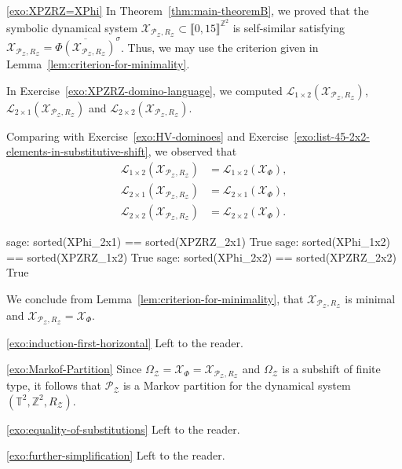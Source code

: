 \documentclass[12pt]{amsart}
\newcommand{\Z}{\mathbb{Z}}
\newcommand{\Lcal}{\mathcal{L}}
\newcommand{\Pcal}{\mathcal{P}}
\newcommand{\Xcal}{\mathcal{X}} %
\newcommand{\Zcal}{\mathcal{Z}}
\newcommand{\shiftclosure}[1]{{\overline{#1}^{\sigma}}}
\newcommand{\Zrange}[1]{\llbracket0,#1\rrbracket}
\newcommand{\torus}{\mathbb{T}}
\begin{document}
    \begin{exosolution}{\ref{exo:XPZRZ=XPhi}}
        In Theorem~\ref{thm:main-theoremB}, we proved that the symbolic dynamical system
        $\Xcal_{\Pcal_\Zcal,R_\Zcal}\subset\Zrange{15}^{\Z^2}$ is self-similar satisfying
        $\Xcal_{\Pcal_\Zcal,R_\Zcal}=\shiftclosure{\Phi(\Xcal_{\Pcal_\Zcal,R_\Zcal})}$.
        Thus, we may use the criterion given in Lemma~\ref{lem:criterion-for-minimality}.

        In Exercise~\ref{exo:XPZRZ-domino-language}, 
        we computed
        $\Lcal_{1\times 2}(\Xcal_{\Pcal_\Zcal,R_\Zcal})$,
        $\Lcal_{2\times 1}(\Xcal_{\Pcal_\Zcal,R_\Zcal})$ and
        $\Lcal_{2\times 2}(\Xcal_{\Pcal_\Zcal,R_\Zcal})$.

        Comparing with 
        Exercise~\ref{exo:HV-dominoes} and
        Exercise~\ref{exo:list-45-2x2-elements-in-substitutive-shift},
        we observed that
        \begin{align*}
            \Lcal_{1\times 2}(\Xcal_{\Pcal_\Zcal,R_\Zcal})&=\Lcal_{1\times 2}(\Xcal_\Phi),\\
            \Lcal_{2\times 1}(\Xcal_{\Pcal_\Zcal,R_\Zcal})&=\Lcal_{2\times 1}(\Xcal_\Phi),\\
            \Lcal_{2\times 2}(\Xcal_{\Pcal_\Zcal,R_\Zcal})&=\Lcal_{2\times 2}(\Xcal_\Phi).
        \end{align*}
\begin{sagecommandlinetcb}
\begin{sagecommandline}
sage: sorted(XPhi_2x1) == sorted(XPZRZ_2x1)
True
sage: sorted(XPhi_1x2) == sorted(XPZRZ_1x2) 
True
sage: sorted(XPhi_2x2) == sorted(XPZRZ_2x2)
True
\end{sagecommandline}
\end{sagecommandlinetcb}
We conclude from Lemma~\ref{lem:criterion-for-minimality},
that $\Xcal_{\Pcal_\Zcal,R_\Zcal}$ is minimal and $\Xcal_{\Pcal_\Zcal,R_\Zcal}=\Xcal_\Phi$.
\end{exosolution}

\begin{exosolution}{\ref{exo:induction-first-horizontal}}
    Left to the reader.
\end{exosolution}

\begin{exosolution}{\ref{exo:Markof-Partition}}
    Since $\Omega_\Zcal =\Xcal_\Phi =\Xcal_{\Pcal_\Zcal,R_\Zcal}$
    and $\Omega_\Zcal$ is a subshift of finite type,
    it follows that $\Pcal_\Zcal$ is a Markov partition
    for the dynamical system $(\torus^2,\Z^2,R_\Zcal)$.
\end{exosolution}

\begin{exosolution}{\ref{exo:equality-of-substitutions}}
    Left to the reader.
\end{exosolution}

\begin{exosolution}{\ref{exo:further-simplification}}
    Left to the reader.
\end{exosolution}



\end{document}
